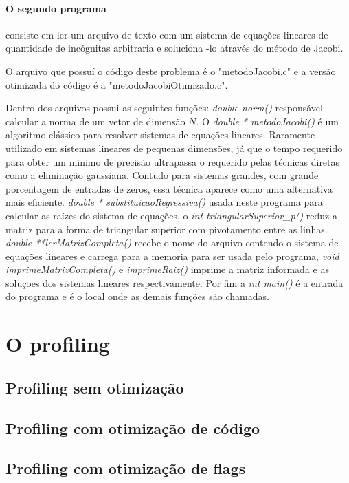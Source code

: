 \documentclass[]{article}
\begin{document}
\paragraph{O segundo programa} consiste em ler um arquivo de texto com um sistema de equações lineares de quantidade de incógnitas arbitraria e soluciona -lo através do método de Jacobi.

O arquivo que possuí o código deste problema é o "metodoJacobi.c" e a versão otimizada do código é a  "metodoJacobiOtimizado.c". 

Dentro dos arquivos possui as seguintes funções: \textit{double norm()} responsável calcular a norma de um vetor de dimensão $N$. O \textit{double * metodoJacobi()} é um algoritmo clássico para resolver sistemas de equações lineares. Raramente utilizado em sistemas lineares de pequenas dimensões, já que o tempo requerido para obter um minimo de precisão ultrapassa o requerido pelas técnicas diretas como a eliminação gaussiana. Contudo para sistemas grandes, com grande porcentagem de entradas de zeros, essa técnica aparece como uma alternativa mais eficiente. \textit{double * substituicaoRegressiva()} usada neste programa para calcular as raízes do sistema de equações, o \textit{int triangularSuperior\_p()} reduz a matriz para a forma de triangular superior com pivotamento entre as linhas. \textit{double **lerMatrizCompleta()} recebe o nome do arquivo contendo o sistema de equações lineares e carrega para a memoria para ser usada pelo programa, \textit{void imprimeMatrizCompleta()} e \textit{imprimeRaiz()} imprime a matriz informada e as soluçoes dos sistemas lineares respectivamente.  Por fim a \textit{int main()} é a entrada do programa e é o local onde as demais funções são chamadas.

\section{O profiling}

\subsection{Profiling sem otimização}

\subsection{Profiling com otimização de código}

\subsection{Profiling com otimização de flags}
\end{document}
